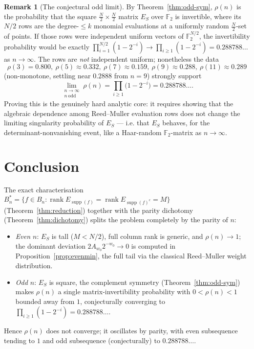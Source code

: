 \documentclass{amsart}
\theoremstyle{definition}
\newtheorem{remark}[theorem]{Remark}
\DeclareMathOperator{\supp}{supp}
\DeclareMathOperator{\rank}{rank}
\newcommand{\F}{\mathbb{F}}
\begin{document}
\begin{remark}[The conjectural odd limit]\label{rem:oddlimit}
By Theorem~\ref{thm:odd-sym}, $\rho(n)$ is the probability that the square
$\tfrac N2\times\tfrac N2$ matrix $E_S$ over $\F_2$ is invertible, where
its $N/2$ rows are the degree-$\le k$ monomial evaluations at a uniformly
random $\tfrac N2$-set of points. If those rows were independent uniform
vectors of $\F_2^{N/2}$, the invertibility probability would be exactly
$\prod_{i=1}^{N/2}(1-2^{-i})\to\prod_{i\ge1}(1-2^{-i})=0.288788\ldots$ as
$n\to\infty$. The rows are \emph{not} independent uniform; nonetheless the
data
\[
\rho(3)=0.800,\ \rho(5)\approx0.332,\ \rho(7)\approx0.159,\
\rho(9)\approx0.288,\ \rho(11)\approx0.289
\]
(non-monotone, settling near $0.2888$ from $n=9$) strongly support
\[
\lim_{\substack{n\to\infty\\ n\ \mathrm{odd}}}\rho(n)
=\prod_{i\ge1}\bigl(1-2^{-i}\bigr)=0.288788\ldots .
\]
Proving this is the genuinely hard analytic core: it requires showing that
the algebraic dependence among Reed--Muller evaluation rows does not
change the limiting singularity probability of $E_S$ — i.e. that $E_S$
behaves, for the determinant-nonvanishing event, like a Haar-random
$\F_2$-matrix as $n\to\infty$.
\end{remark}

\section{Conclusion}

The exact characterisation $B_n^*=\{f\in B_n:\rank E_{\supp(f)}=\rank
E_{\supp(f)^c}=M\}$ (Theorem~\ref{thm:reduction}) together with the parity
dichotomy (Theorem~\ref{thm:dichotomy}) splits the problem completely by
the parity of $n$:
\begin{itemize}
\item \emph{Even $n$}: $E_S$ is tall ($M<N/2$), full column rank is
generic, and $\rho(n)\to1$; the dominant deviation
$2A_{w_0}2^{-w_0}\to0$ is computed in
Proposition~\ref{prop:evenmin}, the full tail via the classical
Reed--Muller weight distribution.
\item \emph{Odd $n$}: $E_S$ is square, the complement symmetry
(Theorem~\ref{thm:odd-sym}) makes $\rho(n)$ a single matrix-invertibility
probability with $0<\rho(n)<1$ bounded away from $1$, conjecturally
converging to $\prod_{i\ge1}(1-2^{-i})=0.288788\ldots$.
\end{itemize}
Hence $\rho(n)$ does not converge; it oscillates by parity, with even
subsequence tending to $1$ and odd subsequence (conjecturally) to
$0.288788\ldots$.
\end{document}
